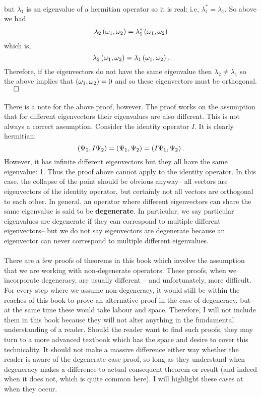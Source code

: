 \begin{enumerate}
$$\begin{aligned}
    \end{aligned}
    $$
    but $\lambda_{1}$ is an eigenvalue of a hermitian operator so it is real: i.e, $\lambda_{1}^{\ast}=\lambda_{1}$. So above we had 
    $$
    \begin{aligned}
    \lambda_{2}\left(\omega_{1},\omega_{2}\right)&=\lambda_{1}^{\ast}\left(\omega_{1},\omega_{2}\right)\\
    \end{aligned}
    $$
    which is,
    $$
    \lambda_{2}\left(\omega_{1},\omega_{2}\right)=\lambda_{1}\left(\omega_{1},\omega_{2}\right).\\
    $$
    Therefore, if the eigenvectors do not have the same eigenvalue then $\lambda_{2}\neq\lambda_{1}$ so the above implies that $\left(\omega_{1},\omega_{2}\right)=0$ and so these eigenvectors must be orthogonal. $\:\:\:\:\:\:\square$
    \\\\
    There is a note for the above proof, however. The proof works on the assumption that for different eigenvectors their eigenvalues are also different. This is not always a correct assumption. Consider the identity operator $I$. It is clearly hermitian:
    $$
    \left(\Psi_{1},I\Psi_{2}\right)=\left(\Psi_{1},\Psi_{2}\right)=\left(I\Psi_{1},\Psi_{2}\right).
    $$
    However, it has infinite different eigenvectors but they all have the same eigenvalue: 1. Thus the proof above cannot apply to the identity operator. In this case, the collapse of the point should be obvious anyway-- all vectors are eigenvectors of the identity operator, but certainly not all vectors are orthogonal to each other. In general, an operator where different eigenvectors can share the same eigenvalue is said to be \textbf{degenerate}. In particular, we say particular eigenvalues are degenerate if they can correspond to multiple different eigenvectors-- but we do not say eigenvectors are degenerate because an eigenvector can never correspond to multiple different eigenvalues. 
    \\\\
    There are a few proofs of theorems in this book which involve the assumption that we are working with non-degenerate operators. These proofs, when we incorporate degeneracy, are usually different -- and unfortunately, more difficult. For every step where we assume non-degeneracy, it would still be within the reaches of this book to prove an alternative proof in the case of degeneracy, but at the same time these would take labour and space. Therefore, I will not include them in this book because they will not alter anything in the fundamental understanding of a reader. Should the reader want to find such proofs, they may turn to a more advanced textbook which has the space and desire to cover this technicality. It should not make a massive difference either way whether the reader is aware of the degenerate case proof, so long as they understand when degeneracy makes a difference to actual consequent theorem or result (and indeed when it does not, which is quite common here). I will highlight these cases at when they occur.

\end{enumerate}
